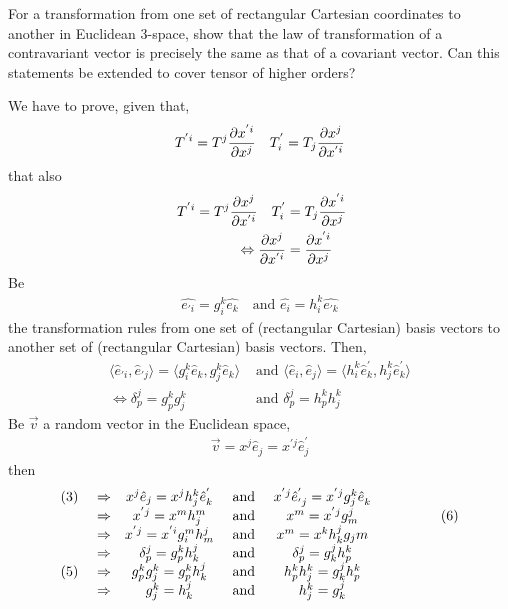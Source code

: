 \begin{tcolorbox}
For a transformation from one set of rectangular Cartesian coordinates to another in Euclidean 3-space, show that the law of transformation of a contravariant vector is precisely the same as that of a covariant vector. Can this statements be extended to cover tensor of higher orders?
\end{tcolorbox}
We have to prove, given that, $$T^{'i}= T^{j} \pdv{x^{'i}}{x^j} \quad T^{'}_{i}= T_{j} \pdv{x^{j}}{x^{'i}}$$ that also
\begin{align}
\ T^{'i}= T^{j} \pdv{x^{j}}{x^{'i}} \quad T^{'}_{i}&= T_{j}\pdv{x^{'i}}{x^j} \\
\Leftrightarrow \pdv{x^{j}}{x^{'i}} &= \pdv{x^{'i}}{x^j} 
\end{align}
Be
\begin{align}
\hat{e_{'i}} = g_i^k\hat{e_{k}}\quad\text{and } \hat{e_{i}} = h_i^k\hat{e_{'k}}
\end{align}
the transformation rules from one set of (rectangular Cartesian) basis vectors to another set of  (rectangular Cartesian) basis vectors.
Then,
\begin{align}
\langle \hat{e}_{'i},\hat{e}_{'j} \rangle = \langle g_i^k\hat{e}_{k},g_j^k\hat{e}_{k} \rangle &\text{ and } \langle \hat{e}_{i},\hat{e}_{j} \rangle = \langle h_i^k\hat{e}^{'}_{k},h_j^k\hat{e}^{'}_{k} \rangle\\
\Leftrightarrow \delta_p^j = g_p^k g_j^k &\text{ and } \delta_p^j = h_p^k h_j^k
\end{align}
Be $\vec{v}$ a random vector in the Euclidean space,
\begin{align*}
\vec{v} = x^j\hat{e}_{j}= x^{'j}\hat{e}^{'}_{j}
\end{align*}
then
\begin{align*}
\begin{matrix}
\text{(3) } &\Rightarrow& x^j\hat{e}_{j} = x^{j}h_j^k\hat{e}^{'}_{k}&\text{ and }&x^{'j}\hat{e}^{'}_{'j} = x^{'j}g_j^k\hat{e}^{}_{k}&\\
&\Rightarrow &x^{'j} = x^{m}h^m_j  &\text{ and }&x^m = x^{'j}g^j_m&\quad\quad\quad\quad(6)\\
&\Rightarrow &x^{'j} = x^{'i}g_i^m h_m^j&\text{ and }& x^m = x^{k}h_k^j g_jm &\\
&\Rightarrow &\delta_p^j =g_p^k h_k^j &\text{ and }& \delta_p^j =g_k^j h_p^k&\\
\text{(5) } &\Rightarrow& g_p^k g_j^k=g_p^k h_k^j &\text{ and }& h_p^k h_j^k=g_k^j h_p^k\\
 &\Rightarrow &g_j^k =  h_k^j &\text{ and }&h_j^k =  g_k^j&
 \end{matrix}
\end{align*}
